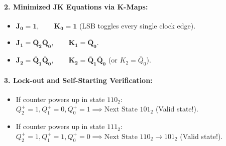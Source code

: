 \documentclass[11pt,a4paper,oneside]{book}
\begin{document}
\paragraph{2. Minimized JK Equations via K-Maps:}
\begin{itemize}
  \item $\mathbf{J_0 = 1, \qquad K_0 = 1}$ (LSB toggles every single clock edge).
  \item $\mathbf{J_1 = \bar{Q}_2 \bar{Q}_0, \qquad K_1 = \bar{Q}_0}$.
  \item $\mathbf{J_2 = \bar{Q}_1 \bar{Q}_0, \qquad K_2 = \bar{Q}_1 \bar{Q}_0}$ (or $K_2 = \bar{Q}_0$).
\end{itemize}

\paragraph{3. Lock-out and Self-Starting Verification:}
\begin{itemize}
  \item If counter powers up in state $110_2$: $Q_2^+=1, Q_1^+=0, Q_0^+=1 \implies \text{Next State } 101_2$ (Valid state!).
  \item If counter powers up in state $111_2$: $Q_2^+=1, Q_1^+=1, Q_0^+=0 \implies \text{Next State } 110_2 \to 101_2$ (Valid state!).
\end{itemize}
\end{document}
